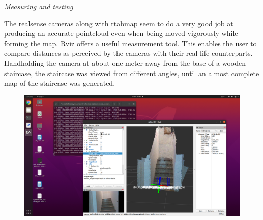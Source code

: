 \documentclass{article}
\begin{document}
\newpage
\textit{Measuring and testing}
\bigskip

The realsense cameras along with rtabmap seem to do a very good job at producing an accurate pointcloud even when being moved vigorously while forming the map. Rviz offers a useful measurement tool. This enables the user to compare distances as perceived by the cameras with their real life counterparts. Handholding the camera at about one meter away from the base of a wooden staircase, the staircase was viewed from different angles, until an almost complete map of the staircase was generated. 

\begin{figure}[h] %
    \centering
	\includegraphics[width=\textwidth,height=\textheight,keepaspectratio,trim={18cm 0 4cm 8cm},clip]{report1-img011.png} %
\end{figure}
\end{document}
